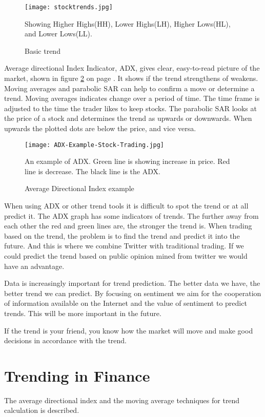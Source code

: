 \begin{figure}[htb]
    \centering
    \texttt{[image: stocktrends.jpg]} 
    \label{fig:stocktrends}
    \caption{Basic trend}
Showing Higher Highs(HH), Lower Highs(LH), Higher Lows(HL), and Lower Lows(LL). 
\end{figure}

Average directional Index Indicator, ADX, gives clear, easy-to-read picture of
the market, shown in figure \ref{fig:ADX-Example-Stock-Trading} on page
\pageref{fig:ADX-Example-Stock-Trading}. It shows if the trend strengthens of
weakens. Moving averages and parabolic SAR can help to confirm a move or
determine a trend. Moving averages indicates change over a period of time. The
time frame is adjusted to the time the trader likes to keep stocks. The
parabolic SAR looks at the price of a stock and determines the trend as upwards
or downwards. When upwards the plotted dots are below the price, and vice versa.
 
\begin{figure}[htb]
    \centering
    \texttt{[image: ADX-Example-Stock-Trading.jpg]} 
    \label{fig:ADX-Example-Stock-Trading}
    \caption{Average Directional Index example}
An example of ADX. Green line is showing increase in price. Red line is
decrease. The black line is the ADX. 
\end{figure}

When using ADX or other trend tools it is difficult to spot the trend or at all
predict it. The ADX graph has some indicators of trends. The further away from
each other the red and green lines are, the stronger the trend is.  
When trading based on the trend, the problem is to find the trend and predict
it into the future. And this is where we combine Twitter with traditional
trading. If we could predict the trend based on public opinion mined from
twitter we would have an advantage. 

Data is increasingly important for trend prediction. The better data we have,
the better trend we can predict. By focusing on sentiment we aim for the
cooperation of information available on the Internet and the value of sentiment
to predict trends. This will be more important in the future.  

If the trend is your friend, you know how the market will move and make
good decisions in accordance with the trend. 
%

\section{Trending in Finance}\label{trend:trends_in_finance}
The average directional index and the moving average techniques for trend
calculation is described.  

